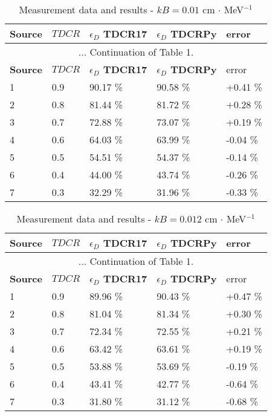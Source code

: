 \documentclass[12pt]{iopart}
\begin{document}
\pagebreak

\begingroup
\footnotesize
\begin{longtable}[l]{| p{} | p{} | p{} |p{} |p{} |} 
\caption{Measurement data and results - $kB = 0.01$ cm $\cdot$ MeV$^{-1}$}
\label{Table1} \\ 
\hline
\textbf{Source} & \textbf{$TDCR$} & \textbf{$\epsilon_{D}$ TDCR17} & \textbf{$\epsilon_{D}$ TDCRPy} & error \\ 
\endfirsthead
\multicolumn{5}{c}{... Continuation of Table 1.}\\ 
\hline
 \textbf{Source} & \textbf{$TDCR$} & \textbf{$\epsilon_{D}$ TDCR17} & \textbf{$\epsilon_{D}$ TDCRPy} & error \\   \hline 
\endhead
\hline
 1 &  0.9  &  90.17 \% &   90.58 \% &  +0.41 \% \\
 2 &  0.8  &  81.44 \% &   81.72 \% &  +0.28 \% \\
 3 &  0.7  &  72.88 \% &   73.07 \% &  +0.19 \% \\
 4 &  0.6  &  64.03 \% &   63.99 \% &  -0.04 \% \\
 5 &  0.5  &  54.51 \% &   54.37 \% &  -0.14 \% \\
 6 &  0.4  &  44.00 \% &   43.74 \% &  -0.26 \% \\
 7 &  0.3  &  32.29 \% &   31.96 \% &  -0.33 \% \\
\hline
\end{longtable} 
\endgroup

\begingroup
\footnotesize
\begin{longtable}[l]{| p{} | p{} |p{} |p{} |p{} |} 
\caption{Measurement data and results - $kB = 0.012$ cm $\cdot$ MeV$^{-1}$}
\label{Table1} \\ 
\hline
\textbf{Source} & \textbf{$TDCR$} & \textbf{$\epsilon_{D}$ TDCR17} & \textbf{$\epsilon_{D}$ TDCRPy} & error \\ 
\endfirsthead
\multicolumn{5}{c}{... Continuation of Table 1.}\\ 
\hline
 \textbf{Source} & \textbf{$TDCR$} & \textbf{$\epsilon_{D}$ TDCR17} & \textbf{$\epsilon_{D}$ TDCRPy} & error \\   \hline 
\endhead
\hline
 1 & 0.9   &   89.96 \% &   90.43 \% & +0.47 \% \\
 2 & 0.8   &   81.04 \% &   81.34 \% & +0.30 \% \\
 3 & 0.7   &   72.34 \% &   72.55 \% & +0.21 \% \\
 4 & 0.6   &   63.42 \% &   63.61 \% & +0.19 \% \\
 5 & 0.5   &   53.88 \% &   53.69 \% & -0.19 \% \\
 6 & 0.4   &   43.41 \% &   42.77 \% & -0.64 \% \\
 7 & 0.3   &   31.80 \% &   31.12 \% & -0.68 \% \\
\hline
\end{longtable} 
\endgroup
\end{document}

